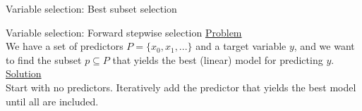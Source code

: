 \documentclass[8pt]{beamer}
\begin{document}
     \begin{frame}[t]{Variable selection: Best subset selection} %
        \centering
        \vfill
        \vfill
     \end{frame}

     \begin{frame}[t]{Variable selection: Forward stepwise selection} %
        \underline{Problem}\\
        We have a set of predictors $P=\{x_0, x_1, ...\}$ and a target variable $y$, and we want to find the subset $p \subseteq P$ that yields the best (linear) model for predicting $y$.\\
        \vspace{0.25cm}
        \underline{Solution}\\
        Start with no predictors. Iteratively add the predictor that yields the best model until all are included.\\
    \end{frame}
\end{document}
